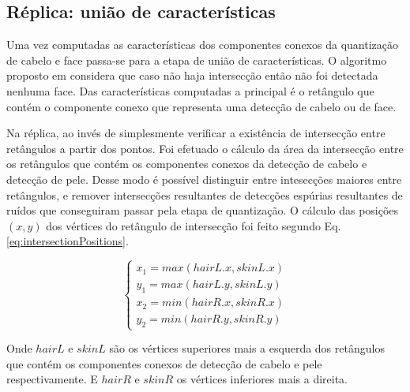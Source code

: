 \documentclass[journal,onecolumn]{IEEEtran}
\begin{document}
	 \subsection{Réplica: união de características}
	 
	Uma vez computadas as características dos componentes conexos da quantização de cabelo e face passa-se para a etapa de união de características.
	O algoritmo proposto em \cite{chen2007simple} considera que caso não haja intersecção então não foi detectada nenhuma face.
	Das características computadas a principal é o retângulo que contém o componente conexo que representa uma detecção de cabelo ou de face.
	
	Na réplica, ao invés de simplesmente verificar a existência de intersecção entre retângulos a partir dos pontos.
	Foi efetuado o cálculo da área da intersecção entre os retângulos que contém os componentes conexos da detecção de cabelo e detecção de pele.
	Desse modo é possível distinguir entre intesecções maiores entre retângulos, e remover intersecções resultantes de detecções espúrias resultantes de ruídos que conseguiram passar pela etapa de quantização.
	O cálculo das posições $(x,y)$ dos vértices do retângulo de intersecção foi feito segundo Eq.\eqref{eq:intersectionPositions}.
	 
	 \begin{equation}
	 	\begin{cases}
	 	x_1 = max(hairL.x,skinL.x) \\
	 	y_1 = max(hairL.y,skinL.y) \\
	 	
	 	x_2 = min(hairR.x,skinR.x) \\
	 	y_2 = min(hairR.y,skinR.y) 
	 	\end{cases}
	 	\label{eq:intersectionPositions}
	 \end{equation}
	 
	Onde $hairL$ e $skinL$ são os vértices superiores mais a esquerda dos retângulos que contém os componentes conexos de detecção de cabelo e pele respectivamente.
	E $hairR$ e $skinR$ os vértices inferiores mais a direita.
	
\end{document}
